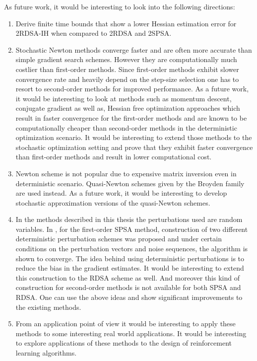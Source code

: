 As future work, it would be interesting to look into the following directions:
\begin{enumerate}
\item Derive finite time bounds that show a lower Hessian estimation error for 2RDSA-IH when compared to 2RDSA and 2SPSA. 
\item Stochastic Newton methods converge faster and  are often more accurate than simple gradient search schemes. However they are computationally much costlier than first-order methods. Since first-order methods exhibit slower convergence rate and heavily depend on the step-size selection one has to resort to second-order methods for improved performance. As a future work, it would be interesting to look at  methods such as momentum descent, conjugate gradient as well as, Hessian free optimization approaches which result in faster convergence for the first-order methods and are known to be computationally cheaper than second-order methods in the deterministic optimization scenario. It would be interesting to extend those methods to the stochastic optimization setting and prove that they exhibit  faster convergence than first-order methods and result in lower computational cost. 
\item Newton scheme is not popular due to expensive matrix inversion even in deterministic scenario. Quasi-Newton schemes given by the Broyden family are used instead. As a future work, it would be interesting to develop stochastic approximation versions of the quasi-Newton schemes.  
\item In the methods described in this thesis the perturbations used are random variables. In \cite{bhatnagar2003two}, for the first-order SPSA method,  construction of two different deterministic  perturbation schemes was proposed and  under certain conditions on the perturbation vectors and noise sequences, the algorithm is shown to converge. The idea behind using deterministic perturbations is to reduce the bias in the gradient estimates. It would be interesting to extend this construction to the RDSA scheme as well. And moreover this kind of construction for second-order methods is not available for both SPSA and RDSA. One can use the above ideas and show significant improvements to the existing methods.
\item From an application point of view it would be interesting to apply these methods to some interesting real world applications. It would be interesting to explore applications of  these methods  to the design of reinforcement learning algorithms.
\end{enumerate}